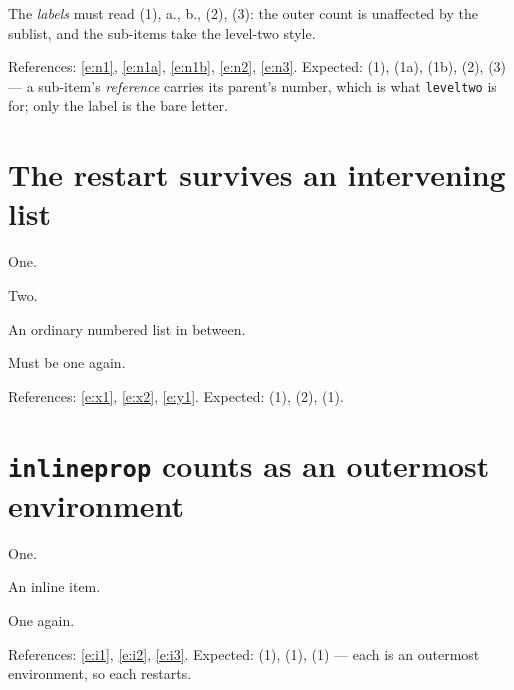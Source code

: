 \documentclass{article}
\begin{document}
The \emph{labels} must read (1), a., b., (2), (3): the outer count is
unaffected by the sublist, and the sub-items take the level-two style.

References: \ref{e:n1}, \ref{e:n1a}, \ref{e:n1b}, \ref{e:n2}, \ref{e:n3}.
Expected: (1), (1a), (1b), (2), (3) --- a sub-item's \emph{reference} carries
its parent's number, which is what \texttt{leveltwo} is for; only the label
is the bare letter.

\section{The restart survives an intervening list}

\begin{prop}[style=enum]
  \item One. \label{e:x1}
  \item Two. \label{e:x2}
\end{prop}

\begin{prop}
  \item An ordinary numbered list in between.
\end{prop}

\begin{prop}[style=enum]
  \item Must be one again. \label{e:y1}
\end{prop}

References: \ref{e:x1}, \ref{e:x2}, \ref{e:y1}.  Expected: (1), (2), (1).

\section{\texttt{inlineprop} counts as an outermost environment}

\begin{prop}[style=enum]
  \item One. \label{e:i1}
\end{prop}

\begin{inlineprop}[style=enum]
  \item An inline item. \label{e:i2}
\end{inlineprop}

\begin{prop}[style=enum]
  \item One again. \label{e:i3}
\end{prop}

References: \ref{e:i1}, \ref{e:i2}, \ref{e:i3}.  Expected: (1), (1), (1) ---
each is an outermost environment, so each restarts.
\end{document}
